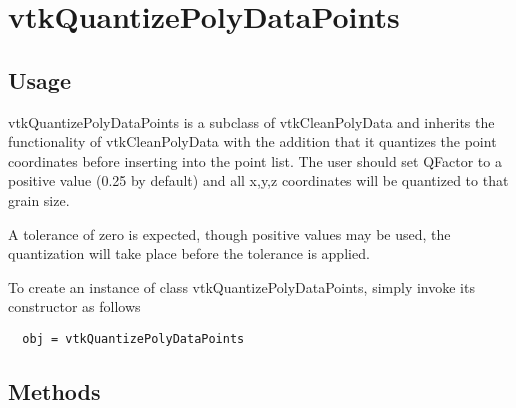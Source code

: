 \section{vtkQuantizePolyDataPoints}

\subsection{Usage}

 vtkQuantizePolyDataPoints is a subclass of vtkCleanPolyData and
 inherits the functionality of vtkCleanPolyData with the addition that
 it quantizes the point coordinates before inserting into the point list.
 The user should set QFactor to a positive value (0.25 by default) and all
 {x,y,z} coordinates will be quantized to that grain size.

 A tolerance of zero is expected, though positive values may be used, the
 quantization will take place before the tolerance is applied.


To create an instance of class vtkQuantizePolyDataPoints, simply
invoke its constructor as follows
\begin{verbatim}
  obj = vtkQuantizePolyDataPoints
\end{verbatim}
\subsection{Methods}

